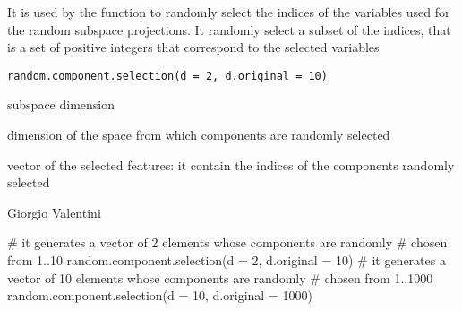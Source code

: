 \documentclass{article}
\begin{document}
\begin{Description}\relax
It is used by the function  to randomly select the indices of the variables used for the 
random subspace projections. It randomly select a subset of the indices, that is a set of positive integers that
correspond to the selected variables
\end{Description}
\begin{Usage}
\begin{verbatim}
random.component.selection(d = 2, d.original = 10)
\end{verbatim}
\end{Usage}
\begin{Arguments}
\begin{ldescription}
\item[\code{d}] subspace dimension 
\item[\code{d.original}] dimension of the space from which components are randomly selected  
\end{ldescription}
\end{Arguments}
\begin{Value}
vector of the selected features: it contain the indices of the components randomly selected
\end{Value}
\begin{Author}\relax
Giorgio Valentini 
\end{Author}
\begin{SeeAlso}\relax
{}
\end{SeeAlso}
\begin{Examples}
\begin{ExampleCode}
# it generates a vector of 2 elements whose components are randomly 
# chosen from 1..10
random.component.selection(d = 2, d.original = 10)
# it generates a vector of 10 elements whose components are randomly 
# chosen from 1..1000
random.component.selection(d = 10, d.original = 1000)
\end{ExampleCode}
\end{Examples}
\end{document}

